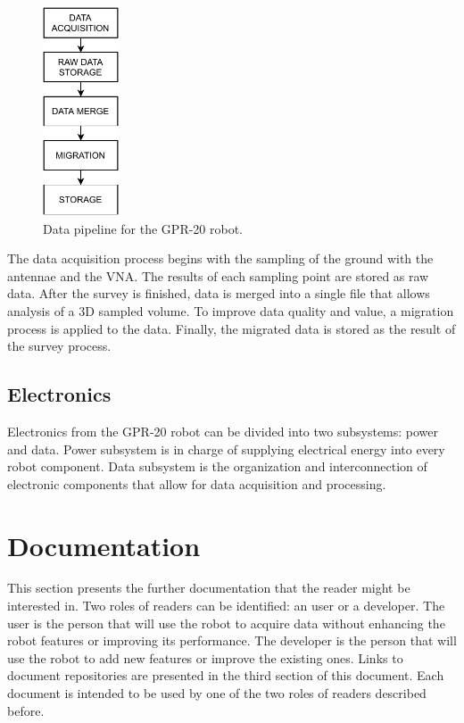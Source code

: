 \documentclass{article}
\begin{document}
\begin{figure}[h]
    \centering
    \includegraphics[width=0.2\textwidth]{images/data_pipeline.pdf}
    \caption{Data pipeline for the GPR-20 robot.}
    \label{fig:gpr-data}
\end{figure}

The data acquisition process begins with the sampling of the ground with the antennae and the VNA. The results of each sampling point are stored as raw data. After the survey is finished, data is merged into a single file that allows analysis of a 3D sampled volume. To improve data quality and value, a migration process is applied to the data. Finally, the migrated data is stored as the result of the survey process.


\subsection{Electronics}
Electronics from the GPR-20 robot can be divided into two subsystems: power and data. Power subsystem is in charge of supplying electrical energy into every robot component. Data subsystem is the organization and interconnection of electronic components that allow for data acquisition and processing. 

\newpage
\section{Documentation}
This section presents the further documentation that the reader might be interested in. Two roles of readers can be identified: an user or a developer. The user is the person that will use the robot to acquire data without enhancing the robot features or improving its performance. The developer is the person that will use the robot to add new features or improve the existing ones. Links to document repositories are presented in the third section of this document. Each document is intended to be used by one of the two roles of readers described before.
\end{document}
